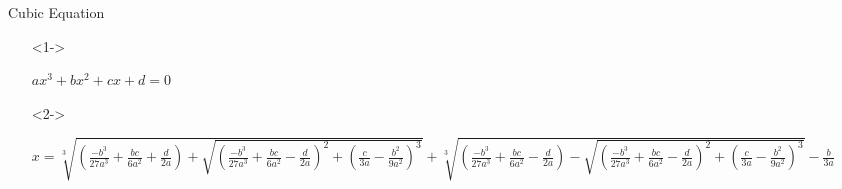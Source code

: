 \documentclass[aspectratio=169,xcolor=dvipsnames]{beamer}
\begin{document}
\begin{frame}{Cubic Equation}
        \begin{itemize}
        \item[] <1-> 
        \begin{center}
            $ax^3 + bx^2 + cx + d = 0$
        \end{center}
        \item[] <2->
        \begin{center}
            $x = \sqrt[3]{\left( \frac{-b^3}{27a^3} + \frac{bc}{6a^2} + \frac{d}{2a} \right) + \sqrt{ \left( \frac{-b^3}{27a^3} + \frac{bc}{6a^2} - \frac{d}{2a} \right)^2 + \left( \frac{c}{3a} - \frac{b^2}{9a^2}\right)^3}} +  \sqrt[3]{\left( \frac{-b^3}{27a^3} + \frac{bc}{6a^2} - \frac{d}{2a} \right) - \sqrt{ \left( \frac{-b^3}{27a^3} + \frac{bc}{6a^2} - \frac{d}{2a} \right)^2 + \left( \frac{c}{3a} - \frac{b^2}{9a^2} \right)^3}} - \frac{b}{3a}$ \\
        \end{center}
    \end{itemize}
\end{frame}
\end{document}
